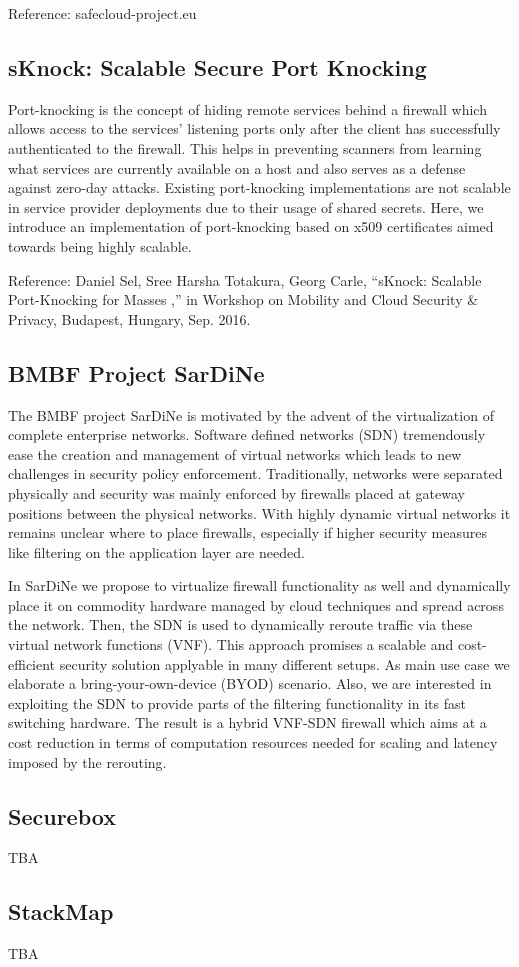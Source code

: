 Reference: 
safecloud-project.eu

\subsection{sKnock: Scalable Secure Port Knocking}

Port-knocking  is  the  concept  of  hiding  remote  services behind   a
  firewall   which   allows   access   to   the   services’ listening
ports only after the client has successfully authenticated to  the
firewall.  This  helps  in  preventing  scanners  from  learning what
services  are  currently  available  on  a  host  and  also  serves as
a  defense  against  zero-day  attacks.  Existing  port-knocking
implementations are not scalable in service provider deployments due to
their usage of shared secrets. Here, we introduce an  implementation  of
port-knocking  based  on  x509  certificates aimed  towards  being
highly  scalable.

Reference:
Daniel Sel, Sree Harsha Totakura, Georg Carle, “sKnock: Scalable
Port-Knocking for Masses ,” in Workshop on Mobility and Cloud Security &
Privacy, Budapest, Hungary, Sep. 2016.

\subsection{BMBF Project SarDiNe}

The BMBF project SarDiNe is motivated by the advent of the virtualization of
complete enterprise networks. Software defined networks (SDN) tremendously ease
the creation and management of virtual networks which leads to new challenges
in security policy enforcement. Traditionally, networks were separated
physically and security was mainly enforced by firewalls placed at gateway
positions between the physical networks. With highly dynamic virtual networks
it remains unclear where to place firewalls, especially if higher security
measures like filtering on the application layer are needed.

In SarDiNe we propose to virtualize firewall functionality as well and
dynamically place it on commodity hardware managed by cloud techniques and
spread across the network. Then, the SDN is used to dynamically reroute traffic
via these virtual network functions (VNF). This approach promises a scalable
and cost-efficient security solution applyable in many different setups. As main
use case we elaborate a bring-your-own-device (BYOD) scenario. Also, we are
interested in exploiting the SDN to provide parts of the filtering
functionality in its fast switching hardware. The result is a hybrid VNF-SDN
firewall which aims at a cost reduction in terms of computation resources
needed for scaling and latency imposed by the rerouting.

\subsection{Securebox}

TBA

\subsection{StackMap}

TBA
